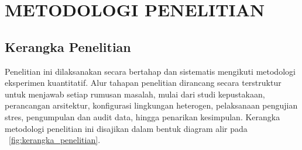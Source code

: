 
\chapter{METODOLOGI PENELITIAN}

\section{Kerangka Penelitian}
Penelitian ini dilaksanakan secara bertahap dan sistematis mengikuti metodologi eksperimen kuantitatif. Alur tahapan penelitian dirancang secara terstruktur untuk menjawab setiap rumusan masalah, mulai dari studi kepustakaan, perancangan arsitektur, konfigurasi lingkungan heterogen, pelaksanaan pengujian stres, pengumpulan dan audit data, hingga penarikan kesimpulan. Kerangka metodologi penelitian ini disajikan dalam bentuk diagram alir pada \figurename\ \ref{fig:kerangka_penelitian}.

